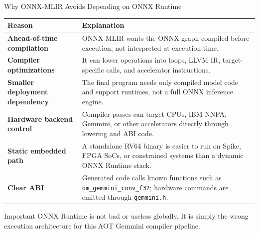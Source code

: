 \documentclass[aspectratio=169,10pt]{beamer}
\newcommand{\code}[1]{\texttt{\footnotesize #1}}
\newcommand{\edgeword}[1]{\textcolor{red!75!black}{\textbf{#1}}}
\begin{document}
\begin{frame}{Why ONNX-MLIR Avoids Depending on ONNX Runtime}
  \scriptsize
  \begin{tabularx}{\textwidth}{@{}lX@{}}
    \toprule
    Reason & Explanation \\
    \midrule
    \edgeword{Ahead-of-time compilation} &
      ONNX-MLIR wants the ONNX graph compiled before execution, not interpreted at execution time. \\
    \edgeword{Compiler optimizations} &
      It can lower operations into loops, LLVM IR, target-specific calls, and accelerator instructions. \\
    \edgeword{Smaller deployment dependency} &
      The final program needs only compiled model code and support runtimes, not a full ONNX inference engine. \\
    \edgeword{Hardware backend control} &
      Compiler passes can target CPUs, IBM NNPA, Gemmini, or other accelerators directly through lowering and ABI code. \\
    \edgeword{Static embedded path} &
      A standalone RV64 binary is easier to run on Spike, FPGA SoCs, or constrained systems than a dynamic ONNX Runtime stack. \\
    \edgeword{Clear ABI} &
      Generated code calls known functions such as \code{om\_gemmini\_conv\_f32}; hardware commands are emitted through \code{gemmini.h}. \\
    \bottomrule
  \end{tabularx}

  \vspace{0.35em}
  \begin{block}{Important}
    ONNX Runtime is not bad or useless globally. It is simply the wrong execution architecture for this AOT Gemmini compiler pipeline.
  \end{block}
\end{frame}
\end{document}
